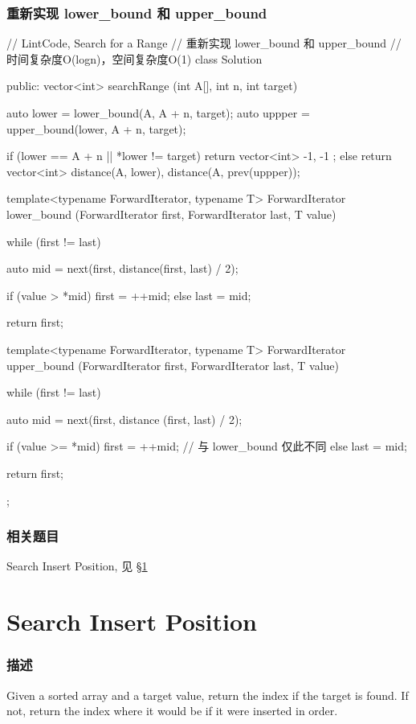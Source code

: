\subsubsection{重新实现 lower_bound 和 upper_bound}
\begin{Code}
// LintCode, Search for a Range
// 重新实现 lower_bound 和 upper_bound
// 时间复杂度O(logn)，空间复杂度O(1)
class Solution {
public:
    vector<int> searchRange (int A[], int n, int target) {
        auto lower = lower_bound(A, A + n, target);
        auto uppper = upper_bound(lower, A + n, target);

        if (lower == A + n || *lower != target)
            return vector<int> { -1, -1 };
        else
            return vector<int> {distance(A, lower), distance(A, prev(uppper))};
    }

    template<typename ForwardIterator, typename T>
    ForwardIterator lower_bound (ForwardIterator first,
            ForwardIterator last, T value) {
        while (first != last) {
            auto mid = next(first, distance(first, last) / 2);

            if (value > *mid)   first = ++mid;
            else                last = mid;
        }

        return first;
    }

    template<typename ForwardIterator, typename T>
    ForwardIterator upper_bound (ForwardIterator first,
            ForwardIterator last, T value) {
        while (first != last) {
            auto mid = next(first, distance (first, last) / 2);

            if (value >= *mid)   first = ++mid;  // 与 lower_bound 仅此不同
            else                 last = mid;
        }

        return first;
    }
};
\end{Code}

\subsubsection{相关题目}
\begindot
\item Search Insert Position, 见 \S \ref{sec:search-insert-position}
\myenddot


\section{Search Insert Position} %
\label{sec:search-insert-position}


\subsubsection{描述}
Given a sorted array and a target value, return the index if the target is found. If not, return the index where it would be if it were inserted in order.

